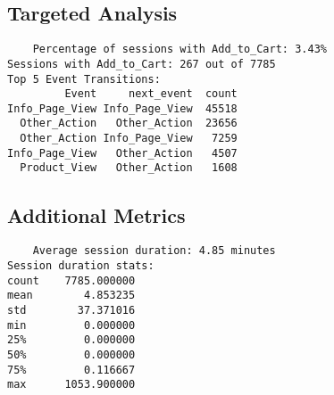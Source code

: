 \documentclass{article}
\begin{document}
    \subsection{Targeted Analysis}
    \begin{verbatim}
    Percentage of sessions with Add_to_Cart: 3.43%
Sessions with Add_to_Cart: 267 out of 7785
Top 5 Event Transitions:
         Event     next_event  count
Info_Page_View Info_Page_View  45518
  Other_Action   Other_Action  23656
  Other_Action Info_Page_View   7259
Info_Page_View   Other_Action   4507
  Product_View   Other_Action   1608
    \end{verbatim}
    
    \subsection{Additional Metrics}
    \begin{verbatim}
    Average session duration: 4.85 minutes
Session duration stats:
count    7785.000000
mean        4.853235
std        37.371016
min         0.000000
25%         0.000000
50%         0.000000
75%         0.116667
max      1053.900000
    \end{verbatim}
    
    
\end{document}
